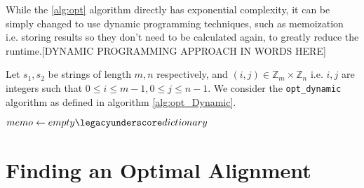 \documentclass{article}
\renewcommand{\_}{\ifincsname_\else\legacyunderscore\fi}
\newcommand{\integer}{\textbf{int} }
\begin{document}
        While the \ref{alg:opt} algorithm directly has exponential complexity, it can be simply changed to use dynamic programming techniques, such as memoization i.e. storing results so they don't need to be calculated again, to greatly reduce the runtime.[DYNAMIC PROGRAMMING APPROACH IN WORDS HERE]

        Let $s_1, s_2$ be strings of length $m, n$ respectively, and $(i, j) \in \mathbb{Z}_m \times \mathbb{Z}_n$ i.e. $i, j$ are integers such that $0 \leq i \leq m - 1, 0 \leq j \leq n - 1$.  We consider the \texttt{opt\_dynamic} algorithm as defined in algorithm \ref{alg:opt_Dynamic}.

        \begin{function}
            \DontPrintSemicolon
            \caption{opt\_dynamic(\integer $i$, \integer $j$)}
            \label{alg:opt_Dynamic}
            $memo \gets empty\_dictionary$ 
        \end{function}

    \section*{Finding an Optimal Alignment}

    \printbibliography
\end{document}
